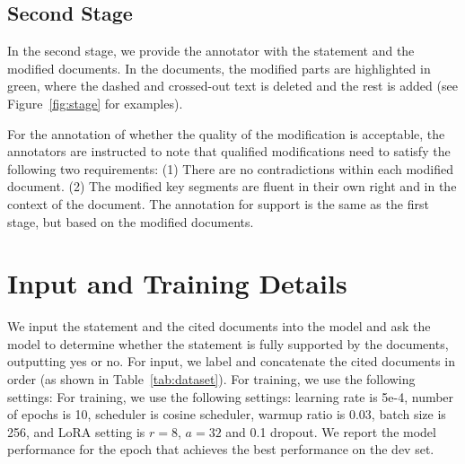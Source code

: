 \subsection{Second Stage}

In the second stage, we provide the annotator with the statement and the modified documents. In the documents, the modified parts are highlighted in green, where the dashed and crossed-out text is deleted and the rest is added (see Figure~\ref{fig:stage} for examples). 

For the annotation of whether the quality of the modification is acceptable, the annotators are instructed to note that qualified modifications need to satisfy the following two requirements: (1) There are no contradictions within each modified document. (2) The modified key segments are fluent in their own right and in the context of the document. The annotation for support is the same as the first stage, but based on the modified documents.

 
\section{Input and Training Details}
\label{app:detail}
We input the statement and the cited documents into the model and ask the model to determine whether the statement is fully supported by the documents, outputting yes or no. For input, we label and concatenate the cited documents in order (as shown in Table~\ref{tab:dataset}). For training, we use the following settings: For training, we use the following settings: learning rate is 5e-4, number of epochs is 10, scheduler is cosine scheduler, warmup ratio is 0.03, batch size is 256, and LoRA setting is $r=8$, $a=32$ and 0.1 dropout. We report the model performance for the epoch that achieves the best performance on the dev set.
\label{app:detail}



